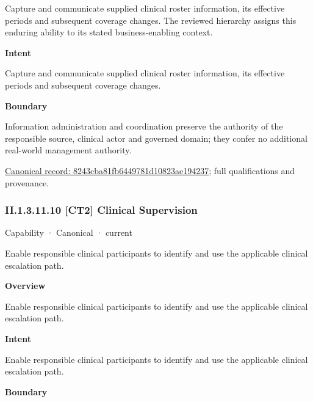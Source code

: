 Capture and communicate supplied clinical roster information, its effective periods and subsequent coverage changes. The reviewed hierarchy assigns this enduring ability to its stated business-enabling context.



\textbf{Intent}



Capture and communicate supplied clinical roster information, its effective periods and subsequent coverage changes.



\textbf{Boundary}



Information administration and coordination preserve the authority of the responsible source, clinical actor and governed domain; they confer no additional real-world management authority.


{\footnotesize \href{../../../../continuum/strategy/capability/8243cba81fb6449781d10823ae194237.md}{Canonical record: 8243cba81fb6449781d10823ae194237}; full qualifications and provenance.}\par
\subsubsection*{II.1.3.11.10 [CT2] Clinical Supervision}
\label{navigation:II.1.3.11.10}

\label{element:f697b1ac79b544749315f31819b17969}
{\small Capability · Canonical · current}\par

Enable responsible clinical participants to identify and use the applicable clinical escalation path.



\textbf{Overview}



Enable responsible clinical participants to identify and use the applicable clinical escalation path.



\textbf{Intent}



Enable responsible clinical participants to identify and use the applicable clinical escalation path.



\textbf{Boundary}



